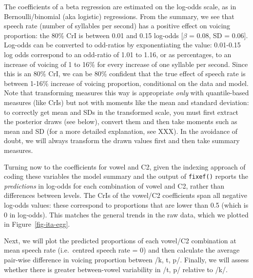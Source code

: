 \documentclass[
  authoryear,
  preprint,
  3p]{elsarticle}
\begin{document}
The coefficients of a beta regression are estimated on the log-odds
scale, as in Bernoulli/binomial (aka logistic) regressions. From the
summary, we see that speech rate (number of syllables per second) has a
positive effect on voicing proportion: the 80\% CrI is between 0.01 and
0.15 log-odds {[}\(\beta\) = 0.08, SD = 0.06{]}. Log-odds can be
converted to odd-ratios by exponentiating the value: 0.01-0.15 log odds
correspond to an odd-ratio of 1.01 to 1.16, or as percentages, to an
increase of voicing of 1 to 16\% for every increase of one syllable per
second. Since this is an 80\% CrI, we can be 80\% confident that the
true effect of speech rate is between 1-16\% increase of voicing
proportion, conditional on the data and model. Note that transforming
measures this way is appropriate \emph{only} with quantile-based
measures (like CrIs) but not with moments like the mean and standard
deviation: to correctly get mean and SDs in the transformed scale, you
must first extract the posterior draws (see below), convert them and
then take moments such as mean and SD (for a more detailed explanation,
see XXX). In the avoidance of doubt, we will always transform the drawn
values first and then take summary measures.

Turning now to the coefficients for vowel and C2, given the indexing
approach of coding these variables the model summary and the output of
\texttt{fixef()} reports the \emph{predictions} in log-odds for each
combination of vowel and C2, rather than differences between levels. The
CrIs of the vowel/C2 coefficients span all negative log-odds values:
these correspond to proportions that are lower than 0.5 (which is 0 in
log-odds). This matches the general trends in the raw data, which we
plotted in Figure~\ref{fig-ita-egg}.

Next, we will plot the predicted proportions of each vowel/C2
combination at mean speech rate (i.e.~centred speech rate = 0) and then
calculate the average pair-wise difference in voicing proportion between
/k, t, p/. Finally, we will assess whether there is greater
between-vowel variability in /t, p/ relative to /k/.
\end{document}
